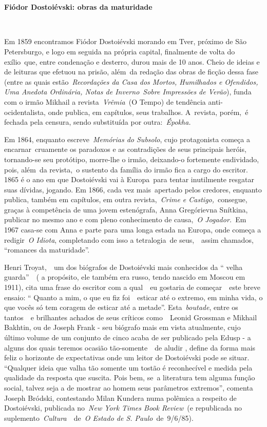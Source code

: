 ~

~

\textbf{Fiódor Dostoiévski: obras da maturidade}

~

Em 1859 encontramos Fiódor Dostoiévski morando em Tver, próximo de São
Petersburgo, e logo em seguida na própria capital, finalmente de volta
do exílio~que, entre condenação e desterro, durou mais de 10 anos. Cheio
de ideias e de leituras que efetuou na prisão, além~da redação das obras
de ficção dessa fase (entre as quais estão~\emph{Recordações da Casa dos
Mortos, Humilhados e Ofendidos, Uma Anedota Ordinária, Notas de
Inverno}~\emph{Sobre Impressões de Verão}), funda com o irmão Mikhail a
revista~\emph{Vrêmia}~(O Tempo) de tendência anti-ocidentalista, onde
publica, em capítulos, seus trabalhos. A~revista, porém,~é fechada pela
censura, sendo substituída por outra:~\emph{Épokha.}

Em 1864, enquanto escreve~\emph{Memórias do Subsolo}, cujo protagonista
começa a encarnar~cruamente os paradoxos e as contradições de seus
principais heróis, tornando-se seu protótipo, morre-lhe o irmão,
deixando-o fortemente endividado, pois, além~da revista,~o sustento da
família do irmão fica a cargo do escritor. 1865 é o ano em que
Dostoiévski vai à Europa~para tentar inutilmente resgatar suas dívidas,
jogando. Em 1866, cada vez mais~apertado pelos credores, enquanto
publica, também em capítulos, em outra revista,~\emph{Crime e
Castigo,}~consegue, graças à competência de uma jovem estenógrafa, Anna
Gregórievna Snítkina, publicar no mesmo ano e com pleno conhecimento de
causa,~\emph{O Jogador.~}Em 1967 casa-se com Anna e parte para uma longa
estada na Europa, onde começa a redigir~\emph{O Idiota}, completando com
isso a tetralogia~de seus,~~assim chamados, ``romances da maturidade''.

Henri Troyat,~~um dos biógrafos de Dostoiévski mais conhecidos da ``
velha guarda''~~( a propósito, ele também era russo, tendo nascido em
Moscou em 1911), cita uma frase do escritor com a qual~~eu gostaria de
começar~~este breve ensaio: `` Quanto a mim, o que eu fiz foi~~esticar
até o extremo, em minha vida, o que vocês só tem coragem de esticar até
a metade''. Esta~\emph{boutade}, entre os tantos~~e brilhantes achados
de seus críticos como~~Leonid Grossman e Mikhail Bakhtin, ou de Joseph
Frank - seu biógrafo mais em vista atualmente, cujo último volume de um
conjunto de cinco acaba de ser publicado pela Edusp - a alguns dos quais
teremos ocasião tão-somente~~de aludir , define da forma mais feliz o
horizonte de expectativas onde um leitor de Dostoiévski pode se situar.
``Qualquer ideia que valha tão somente um tostão é reconhecível e medida
pela qualidade da resposta que suscita. Pois bem, se~a literatura tem
alguma função social, talvez seja a de mostrar ao homem seus parâmetros
extremos'', comenta Joseph Bródski, contestando Milan Kundera numa
polêmica a respeito de Dostoiévski, publicada no~\emph{New York Times
Book Review}~(e republicada no suplemento~\emph{Cultura~}~de~\emph{O
Estado de S. Paulo}~de~9/6/85).

